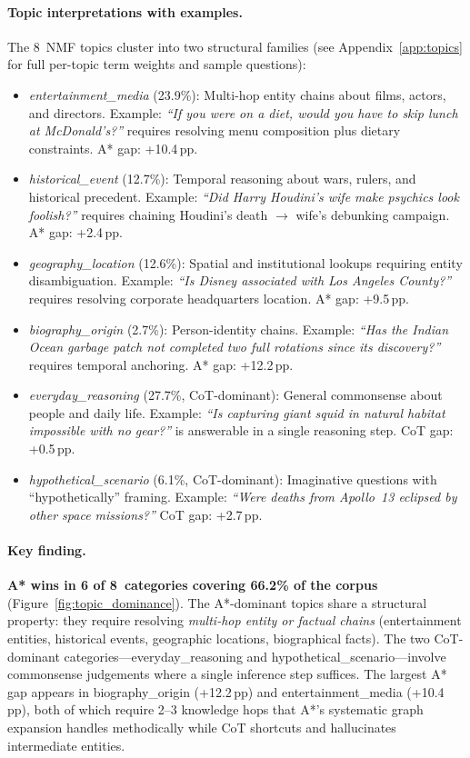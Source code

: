 \documentclass{article}
\newcommand{\pp}{\,pp\xspace}
\begin{document}
\paragraph{Topic interpretations with examples.}
The 8~NMF topics cluster into two structural families (see
Appendix~\ref{app:topics} for full per-topic term weights and sample
questions):
\begin{itemize}[leftmargin=1.5em,itemsep=3pt]
\item \textit{entertainment\_media} (23.9\%): Multi-hop entity chains about
  films, actors, and directors. Example: \emph{``If you were on a diet, would
  you have to skip lunch at McDonald's?''} requires resolving menu composition
  plus dietary constraints.  A* gap: +10.4\pp.
\item \textit{historical\_event} (12.7\%): Temporal reasoning about wars,
  rulers, and historical precedent.  Example: \emph{``Did Harry Houdini's wife
  make psychics look foolish?''} requires chaining Houdini's death $\to$ wife's
  debunking campaign.  A* gap: +2.4\pp.
\item \textit{geography\_location} (12.6\%): Spatial and institutional lookups
  requiring entity disambiguation.  Example: \emph{``Is Disney associated with
  Los Angeles County?''} requires resolving corporate headquarters location.
  A* gap: +9.5\pp.
\item \textit{biography\_origin} (2.7\%): Person-identity chains.  Example:
  \emph{``Has the Indian Ocean garbage patch not completed two full rotations
  since its discovery?''} requires temporal anchoring.  A* gap: +12.2\pp.
\item \textit{everyday\_reasoning} (27.7\%, CoT-dominant): General
  commonsense about people and daily life.  Example: \emph{``Is capturing giant
  squid in natural habitat impossible with no gear?''} is answerable in a
  single reasoning step.  CoT gap: +0.5\pp.
\item \textit{hypothetical\_scenario} (6.1\%, CoT-dominant): Imaginative
  questions with ``hypothetically'' framing.  Example: \emph{``Were deaths from
  Apollo~13 eclipsed by other space missions?''} CoT gap: +2.7\pp.
\end{itemize}

\paragraph{Key finding.}
\textbf{A* wins in 6 of 8~categories covering 66.2\% of the corpus}
(Figure~\ref{fig:topic_dominance}).  The A*-dominant topics share a structural
property: they require resolving \emph{multi-hop entity or factual chains}
(entertainment entities, historical events, geographic locations, biographical
facts).  The two CoT-dominant categories---everyday\_reasoning and
hypothetical\_scenario---involve commonsense judgements where a single
inference step suffices.  The largest A* gap appears in biography\_origin
(+12.2\pp) and entertainment\_media (+10.4\pp), both of which require 2--3
knowledge hops that A*'s systematic graph expansion handles methodically while
CoT shortcuts and hallucinates intermediate entities.
\end{document}
